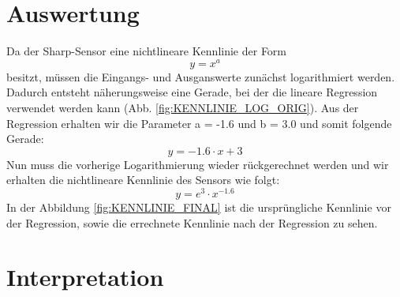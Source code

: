 \documentclass[12pt,oneside,a4paper]{report}
\begin{document}
  
\newpage
\section{Auswertung}
\label{chap:VERSUCH_2_AUSWERTUNG}

Da der Sharp-Sensor eine nichtlineare Kennlinie der Form
\begin{equation}\label{eq:NICHT_LIN_KENN}
y=x^a
\end{equation}
 besitzt, müssen die Eingangs- und Ausganswerte zunächst logarithmiert werden. Dadurch entsteht näherungsweise eine Gerade, bei der die lineare Regression verwendet werden kann (Abb.  \ref{fig:KENNLINIE_LOG_ORIG}).
Aus der Regression erhalten wir die Parameter a = -1.6 und b = 3.0 und somit folgende Gerade:
\begin{equation}\label{eq:NICHT_LIN_KENN}
y= -1.6 \cdot x + 3
\end{equation}
Nun muss die vorherige Logarithmierung wieder rückgerechnet werden und wir erhalten die nichtlineare Kennlinie des Sensors wie folgt:
\begin{equation}\label{eq:_KENNLINIE}
y= e^3 \cdot x^{-1.6}
\end{equation}
In der Abbildung \ref{fig:KENNLINIE_FINAL} ist die ursprüngliche Kennlinie vor der Regression, sowie die errechnete Kennlinie nach der Regression zu sehen.
\paragraph{}


\section{Interpretation}
\label{chap:VERSUCH_2_INTERPRETATION}
\end{document}
